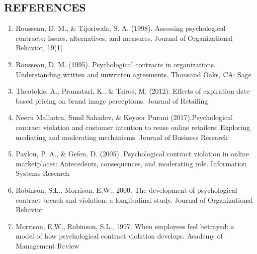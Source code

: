 \documentclass[a4paper, 12pt]{extarticle}
\begin{document}
{\subsection{REFERENCES}
\begin{enumerate}
\item Rousseau, D. M., \& Tijoriwala, S. A. (1998). Assessing psychological contracts: Issues, alternatives, and measures. Journal of Organizational Behavior, 19(1)%
\item Rousseau, D. M. (1995). Psychological contracts in organizations. Understanding written and unwritten agreements. Thousand Oaks, CA: Sage
\item Theotokis, A., Pramatari, K., \& Tsiros, M. (2012). Effects of expiration date-based pricing on brand image perceptions. Journal of Retailing%
\item Neeru Malhotra, Sunil Sahadev, \& Keyoor Purani (2017).Psychological contract violation and customer intention to reuse online retailers: Exploring mediating and moderating mechanisms. Journal of Business Research%
\item Pavlou, P. A., \& Gefen, D. (2005). Psychological contract violation in online marketplaces: Antecedents, consequences, and moderating role. Information Systems Research%
\item Robinson, S.L., Morrison, E.W., 2000. The development of psychological contract breach and violation: a longitudinal study. Journal of Organizational Behavior %
\item Morrison, E.W., Robinson, S.L., 1997. When employees feel betrayed: a model of how psychological contract violation develops. Academy of Management Review%

\end{enumerate}}
\end{document}
